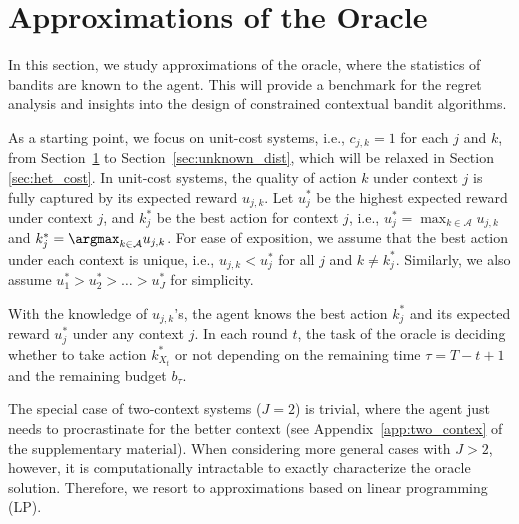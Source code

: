 \section{Approximations of the Oracle} \label{sec:oracle_solution}
In this section, we study approximations of the oracle, where the statistics of bandits are known to the agent. This will provide a benchmark for the regret analysis and insights into the design of constrained contextual bandit algorithms.

As a starting point, we focus on unit-cost systems, i.e., $c_{j,k} = 1$ for each $j$ and $k$, from Section~\ref{sec:oracle_solution} to  Section~\ref{sec:unknown_dist}, which will be relaxed in Section \ref{sec:het_cost}.
In unit-cost systems, the quality of action $k$ under context $j$ is fully captured by its expected reward $u_{j,k}$. Let $u_j^*$ be the highest expected reward under context $j$, and  $k_j^*$ be the best
action for context $j$, i.e.,
$u_j^* = \max_{k \in \mathcal{A}} u_{j,k}$ and $k_j^* = \argmax_{k \in \mathcal{A}} u_{j,k}$.
For ease of exposition, we assume that the best action under each context is unique, i.e., $u_{j,k} < u_j^*$ for all $j$ and $k \neq k_j^*$.
Similarly, we also assume  $u_1^* > u_2^*  > \ldots > u_J^*$ for simplicity.

With the knowledge of $u_{j,k}$'s, the agent  knows the best action $k_j^*$ and its expected reward $u_j^*$ under any context $j$.
In each round $t$, the task of the oracle is deciding whether to take  action $k_{X_t}^*$ or not depending on  the remaining time $\tau = T- t + 1$  and the remaining  budget $b_\tau$.

The special case of two-context systems ($J = 2$) is trivial, where the agent just needs to procrastinate for the better context (see Appendix~\ref{app:two_contex} of the supplementary material).
When considering more general cases with $J > 2$, however, it is computationally intractable to exactly characterize the oracle solution.
Therefore, we resort to approximations  based on linear programming (LP).

